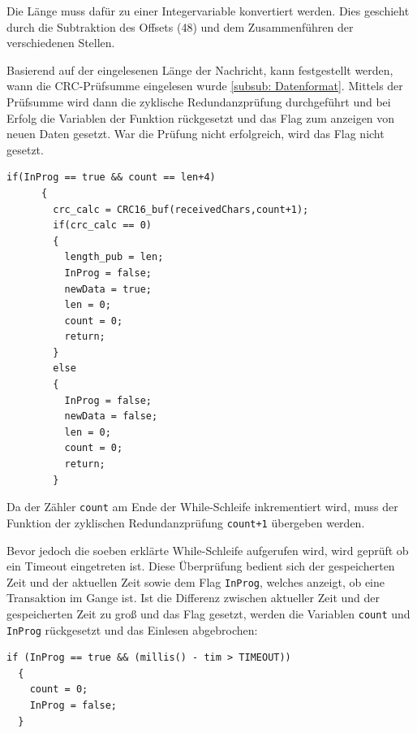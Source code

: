Die Länge muss dafür zu einer Integervariable konvertiert werden. Dies geschieht durch die Subtraktion des Offsets (48) und dem Zusammenführen der verschiedenen Stellen.

\smallskip

Basierend auf der eingelesenen Länge der Nachricht, kann festgestellt werden, wann die CRC-Prüfsumme eingelesen wurde \ref{subsub: Datenformat}. Mittels der Prüfsumme
wird dann die zyklische Redundanzprüfung durchgeführt und bei Erfolg die Variablen der Funktion rückgesetzt und das Flag zum anzeigen von neuen Daten gesetzt. War die Prüfung
nicht erfolgreich, wird das Flag nicht gesetzt.

\begin{lstlisting}[caption={\textit{Zyklsiche Redundanzprüfung}}]
  if(InProg == true && count == len+4)
      {
        crc_calc = CRC16_buf(receivedChars,count+1); 
        if(crc_calc == 0)
        {
          length_pub = len;
          InProg = false; 
          newData = true; 
          len = 0;        
          count = 0;      
          return;
        }
        else
        {
          InProg = false;  
          newData = false; 
          len = 0;         
          count = 0;        
          return;         
        }
\end{lstlisting}

Da der Zähler \lstinline!count! am Ende der While-Schleife inkrementiert wird, muss der Funktion der zyklischen Redundanzprüfung \lstinline!count+1! übergeben werden.

\smallskip

Bevor jedoch die soeben erklärte While-Schleife aufgerufen wird, wird geprüft ob ein Timeout eingetreten ist. Diese Überprüfung bedient sich der gespeicherten Zeit und 
der aktuellen Zeit sowie dem Flag \lstinline!InProg!, welches anzeigt, ob eine Transaktion im Gange ist. Ist die Differenz zwischen aktueller Zeit und der gespeicherten Zeit
zu groß und das Flag gesetzt, werden die Variablen \lstinline!count! und \lstinline!InProg! rückgesetzt und das Einlesen abgebrochen:

\begin{lstlisting}[caption={\textit{Abbruch durch Timeout}}]
  if (InProg == true && (millis() - tim > TIMEOUT))
  {
    count = 0;
    InProg = false;
  }
\end{lstlisting}